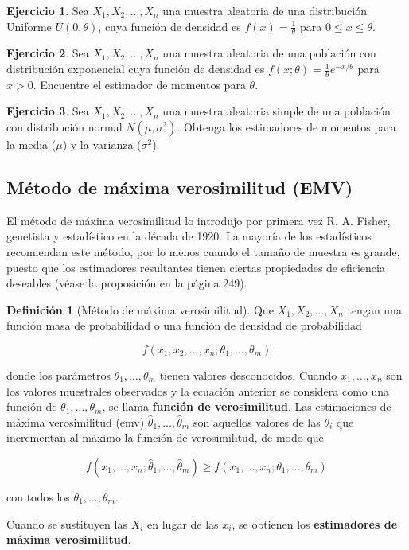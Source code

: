 \documentclass[
  11pt,
]{book}
\theoremstyle{definition}
\newtheorem{definition}{Definición}[chapter]
\theoremstyle{definition}
\theoremstyle{definition}
\newtheorem{exercise}{Ejercicio}[chapter]
\theoremstyle{definition}
\theoremstyle{remark}
\begin{document}
\begin{exercise}
Sea \(X_1, X_2, \dots, X_n\) una muestra aleatoria de una distribución Uniforme \(U(0, \theta)\), cuya función de densidad es \(f(x) = \frac{1}{\theta}\) para \(0 \leq x \leq \theta\).
\end{exercise}

\begin{exercise}
Sea \(X_1, X_2, \dots, X_n\) una muestra aleatoria de una población con distribución exponencial cuya función de densidad es \(f(x; \theta) = \frac{1}{\theta} e^{-x/\theta}\) para \(x > 0\). Encuentre el estimador de momentos para \(\theta\).
\end{exercise}

\begin{exercise}
Sea \(X_1, X_2, \dots, X_n\) una muestra aleatoria simple de una población con distribución normal \(N(\mu, \sigma^2)\). Obtenga los estimadores de momentos para la media (\(\mu\)) y la varianza (\(\sigma^2\)).
\end{exercise}

\subsection{Método de máxima verosimilitud (EMV)}\label{muxe9todo-de-muxe1xima-verosimilitud-emv}

El método de máxima verosimilitud lo introdujo por primera vez R. A. Fisher, genetista y estadístico en la década de 1920. La mayoría de los estadísticos recomiendan este método, por lo menos cuando el tamaño de muestra es grande, puesto que los estimadores resultantes tienen ciertas propiedades de eficiencia deseables (véase la proposición en la página 249).

\begin{definition}[Método de máxima verosimilitud]
Que \(X_1, X_2, \ldots, X_n\) tengan una función masa de probabilidad o una función de densidad de probabilidad

\[
f(x_1, x_2, \ldots, x_n; \theta_1, \ldots, \theta_m)
\]

donde los parámetros \(\theta_1, \ldots, \theta_m\) tienen valores desconocidos. Cuando \(x_1, \ldots, x_n\) son los valores muestrales observados y la ecuación anterior se considera como una función de \(\theta_1, \ldots, \theta_m\), se llama \textbf{función de verosimilitud}. Las estimaciones de máxima verosimilitud (emv) \(\hat{\theta}_1, \ldots, \hat{\theta}_m\) son aquellos valores de las \(\theta_i\) que incrementan al máximo la función de verosimilitud, de modo que

\[
f(x_1, \ldots, x_n; \hat{\theta}_1, \ldots, \hat{\theta}_m) \geq f(x_1, \ldots, x_n; \theta_1, \ldots, \theta_m)
\]

con todos los \(\theta_1, \ldots, \theta_m\).

Cuando se sustituyen las \(X_i\) en lugar de las \(x_i\), se obtienen los \textbf{estimadores de máxima verosimilitud}.
\end{definition}
\end{document}
